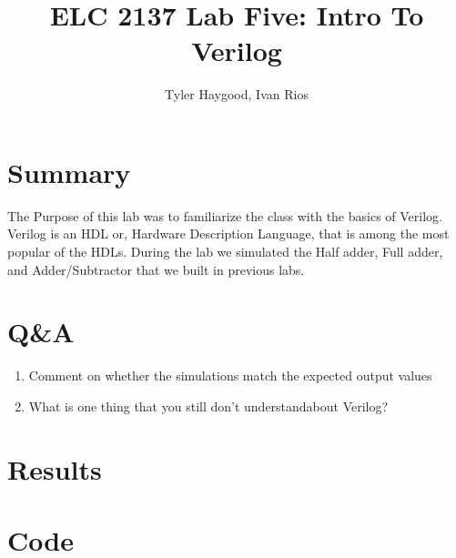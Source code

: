 \documentclass[]{report}
\begin{document}
	
	\title{ELC 2137 Lab Five: Intro To Verilog}
	\author{Tyler Haygood, Ivan Rios}
	\maketitle
	
	\section*{Summary}
	
	The Purpose of this lab was to familiarize the class with the basics of Verilog. Verilog is an HDL or, 
	Hardware Description Language, that is among the most popular of the HDLs. During the lab 
	we simulated the Half adder, Full adder, and Adder/Subtractor that we built in previous labs. 
	
	\section*{Q\&A}
	
	\begin{enumerate}
		\item Comment on whether the simulations match the expected output values  \newline
	
		\item What is one thing that you still don’t understandabout Verilog? \newline
		
	\end{enumerate}
	
	
	\section*{Results}
	
	
	
	\section*{Code}
	
	
	
\end{document}
